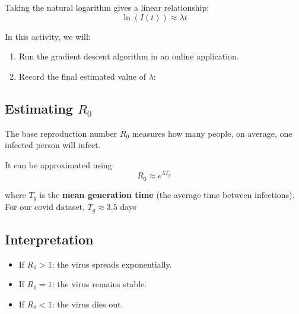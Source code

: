 \documentclass[11pt]{article}
\begin{document}
Taking the natural logarithm gives a linear relationship:
\[
\ln(I(t)) \approx \lambda t
\]

\medskip


In this activity, we will:

\begin{enumerate}
    \item Run the gradient descent algorithm in an online application.
    \item Record the final estimated value of $\lambda$:
\end{enumerate}

\subsection*{Estimating $R_0$}

The base reproduction number $R_0$ measures how many people, on average, one infected person will infect.

It can be approximated using:
\[
R_0 \approx e^{\lambda T_g}
\]

where $T_g$ is the \textbf{mean generation time} (the average time between infections). For our covid dataset, $T_g \approx 3.5$ days

\medskip




\subsection*{Interpretation}

\begin{itemize}
    \item If $R_0 > 1$: the virus spreads exponentially.
    \item If $R_0 = 1$: the virus remains stable.
    \item If $R_0 < 1$: the virus dies out.
\end{itemize}
\end{document}
